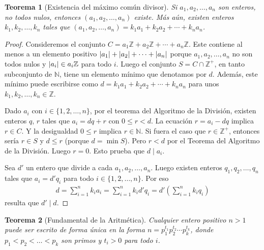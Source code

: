 \documentclass{report}
\newcommand{\naturalNumbers}{\mathbb{N}}
\newcommand{\integerNumbers}{\mathbb{Z}}
\DeclarePairedDelimiter{\abs}{\lvert}{\rvert}
\newtheorem{theorem}{Teorema}
\begin{document}
  \begin{theorem}[Existencia del máximo común divisor]
    Si \(a_1, a_2, \dots, a_n\) son enteros, no todos nulos, entonces \((a_1, a_2, \dots, a_n)\) existe.
    Más aún, existen enteros \(k_1, k_2, \dots, k_n\) tales que \((a_1, a_2, \dots, a_n) = k_1 a_1 + k_2 a_2 + \cdots + k_n a_n\).
  \end{theorem}
  \begin{proof}
    Consideremos el conjunto \(C = a_1 \integerNumbers + a_2 \integerNumbers + \cdots + a_n \integerNumbers\).
    Este contiene al menos a un elemento positivo \(\abs{a_1} + \abs{a_2} + \cdots + \abs{a_n}\) porque \(a_1, a_2, \dots, a_n\) no son todos nulos y \(\abs{a_i} \in a_i \integerNumbers\) para todo \(i\).
    Luego el conjunto \(S = C \cap \integerNumbers^+\), en tanto subconjunto de \(\naturalNumbers\), tiene un elemento mínimo que denotamos por \(d\).
    Además, este mínimo puede escribirse como \(d = k_1 a_1 + k_2 a_2 + \cdots + k_n a_n\) para unos \(k_1, k_2, \dots, k_n \in \integerNumbers\).

    Dado \(a_i\) con \(i \in \{1, 2, \dots, n\}\), por el teorema del Algoritmo de la División, existen enteros \(q\), \(r\) tales que \(a_i = d q + r\) con \(0 \leq r < d\).
    La ecuación \(r = a_i - d q\) implica \(r \in C\).
    Y la desigualdad \(0 \leq r\) implica \(r \in \naturalNumbers\).
    Si fuera el caso que \(r \in \integerNumbers^+\), entonces sería \(r \in S\) y \(d \leq r\) (porque \(d = \min S\)).
    Pero \(r < d\) por el Teorema del Algoritmo de la División.
    Luego \(r = 0\).
    Esto prueba que \(d \mid a_i\).

    Sea \(d'\) un entero que divide a cada \(a_1, a_2, \dots, a_n\).
    Luego existen enteros \(q_1, q_2, \dots, q_n\) tales que \(a_i = d' q_i\) para todo \(i \in \{1, 2, \dots, n\}\).
    Por eso
    \begin{align}
      d
      =
      \sum_{i = 1}^n k_i a_i
      =
      \sum_{i = 1}^n k_i d' q_i
      =
      d' \left( \sum_{i = 1}^n k_i q_i \right)
    \end{align}
    resulta que \(d' \mid d\).
  \end{proof}

  \begin{theorem}[Fundamental de la Aritmética]
    Cualquier entero positivo \(n > 1\) puede ser escrito de forma única en la forma \(n = p_1^{t_1} p_2^{t_2} \cdots p_k^{t_k}\), donde \(p_1 < p_2 < \dots < p_k\) son primos y \(t_i > 0\) para todo \(i\).
  \end{theorem}
\end{document}
